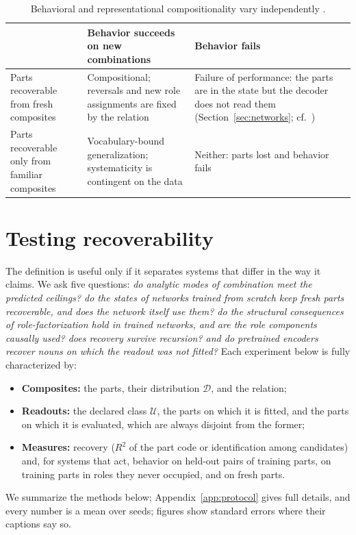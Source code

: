 \documentclass[10pt]{article}
\theoremstyle{plain}
\theoremstyle{remark}
\newcommand{\U}{\mathcal{U}}
\newcommand{\D}{\mathcal{D}}
\begin{document}
\begin{table}[t]
  \caption{Behavioral and representational compositionality vary independently \citep[cf.][]{vegner2025}.}
  \label{tab:twobytwo}
  \centering\small
  \begin{tabularx}{\linewidth}{@{}P{3.2cm}YY@{}}
    \toprule
    & Behavior succeeds on new combinations & Behavior fails \\
    \midrule
    Parts recoverable from fresh composites & Compositional; reversals and new role assignments are fixed by the relation & Failure of performance: the parts are in the state but the decoder does not read them (Section~\ref{sec:networks}; cf.\ \citealt{montero2021,park2024hidden}) \\
    Parts recoverable only from familiar composites & Vocabulary-bound generalization; systematicity is contingent on the data \citep{chaabouni2020} & Neither: parts lost and behavior fails \\
    \bottomrule
  \end{tabularx}
\end{table}

\section{Testing recoverability}
\label{sec:experiments}

The definition is useful only if it separates systems that differ in the way it claims. We ask five questions: \emph{do analytic modes of combination meet the predicted ceilings? do the states of networks trained from scratch keep fresh parts recoverable, and does the network itself use them? do the structural consequences of role-factorization hold in trained networks, and are the role components causally used? does recovery survive recursion? and do pretrained encoders recover nouns on which the readout was not fitted?} Each experiment below is fully characterized by:
\begin{itemize}
  \item \textbf{Composites:} the parts, their distribution $\D$, and the relation;
  \item \textbf{Readouts:} the declared class $\U$, the parts on which it is fitted, and the parts on which it is evaluated, which are always disjoint from the former;
  \item \textbf{Measures:} recovery ($R^2$ of the part code or identification among candidates) and, for systems that act, behavior on held-out pairs of training parts, on training parts in roles they never occupied, and on fresh parts.
\end{itemize}
We summarize the methods below; Appendix~\ref{app:protocol} gives full details, and every number is a mean over seeds; figures show standard errors where their captions say so.
\end{document}
